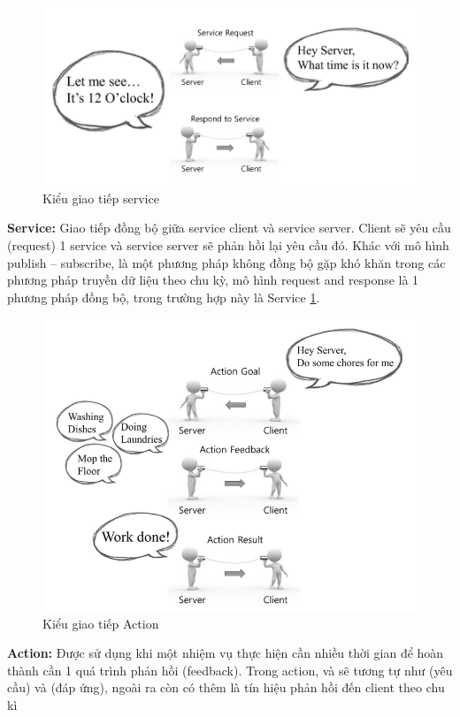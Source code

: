 {\begin{figure}[htbp]
  \centering
  \includegraphics[width=0.9\linewidth]{figures/service.png}
  \caption{Kiểu giao tiếp service}
  \label{fig:service}
\end{figure}
\textbf{Service: } Giao tiếp đồng bộ giữa service client và service server. Client sẽ yêu cầu (request) 1 service và service server sẽ phản hồi lại yêu cầu đó. Khác với mô hình publish – subscribe, là một phương pháp không đồng bộ gặp khó khăn trong các phương pháp truyền dữ liệu theo chu kỳ, mô hình request and response là 1 phương pháp đồng bộ, trong trường hợp này là Service \figurename{ \ref{fig:service}}.

\begin{figure}[htbp]
  \centering
  \includegraphics[width=0.8\linewidth]{figures/action.png}
  \caption{Kiểu giao tiếp Action}
  \label{fig:action}
\end{figure}
\textbf{Action:} Được sử dụng khi một nhiệm vụ thực hiện cần nhiều thời gian để hoàn thành cần 1 quá trình phản hồi (feedback). Trong action,  và  sẽ tương tự như  (yêu cầu) và (đáp ứng), ngoài ra còn có thêm  là tín hiệu phản hồi đến client theo chu kì


}
